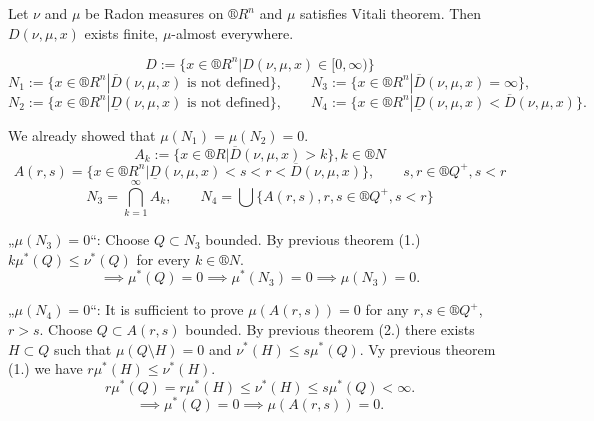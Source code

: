 \documentclass[12pt]{article}					%
\begin{document}
\begin{veta}
	Let $\nu$ and $\mu$ be Radon measures on $®R^n$ and $\mu$ satisfies Vitali theorem. Then $D(\nu, \mu, x)$ exists finite, $\mu$-almost everywhere.

	\begin{dukazin}
		$$ D := \{x \in ®R^n | D(\nu, \mu, x) \in [0, ∞)\} $$
		$$ N_1 := \{x \in ®R^n | \overline{D}(\nu, \mu, x) \text{ is not defined}\}, \qquad N_3 := \{x \in ®R^n | \overline{D}(\nu, \mu, x) = ∞\}, $$
		$$ N_2 := \{x \in ®R^n | \underline{D}(\nu, \mu, x) \text{ is not defined}\}, \qquad N_4 := \{x \in ®R^n | \underline{D}(\nu, \mu, x) < \overline{D}(\nu, \mu, x)\}. $$

		We already showed that $\mu(N_1) = \mu(N_2) = 0$.
		$$ A_k := \{x \in ®R | \overline{D}(\nu, \mu, x) > k\}, k \in ®N $$
		$$ A(r, s) = \{x \in ®R^n | \underline{D}(\nu, \mu, x) < s < r < \overline{D}(\nu, \mu, x)\}, \qquad s, r \in ®Q^+, s < r $$
		$$ N_3 = \bigcap_{k=1}^∞ A_k, \qquad N_4 = \bigcup \{A(r, s), r, s \in ®Q^+, s < r\} $$

		„$\mu(N_3) = 0$“: Choose $Q \subset N_3$ bounded. By previous theorem (1.) $k \mu^*(Q) ≤ \nu^*(Q)$ for every $k \in ®N$.
		$$ \implies \mu^*(Q) = 0 \implies \mu^*(N_3) = 0 \implies \mu(N_3) = 0. $$

		„$\mu(N_4) = 0$“: It is sufficient to prove $\mu(A(r, s)) = 0$ for any $r, s \in ®Q^+$, $r > s$. Choose $Q \subset A(r, s)$ bounded. By previous theorem (2.) there exists $H \subset Q$ such that $\mu(Q \setminus H) = 0$ and $\nu^*(H) ≤ s \mu^*(Q)$.
		Vy previous theorem (1.) we have $r \mu^*(H) ≤ \nu^*(H)$.
		$$ r \mu^*(Q) = r \mu^*(H) ≤ \nu^*(H) ≤ s \mu^*(Q) < ∞. $$
		$$ \implies \mu^*(Q) = 0 \implies \mu(A(r, s)) = 0. $$
	\end{dukazin}
\end{veta}

\pagebreak
\end{document}
